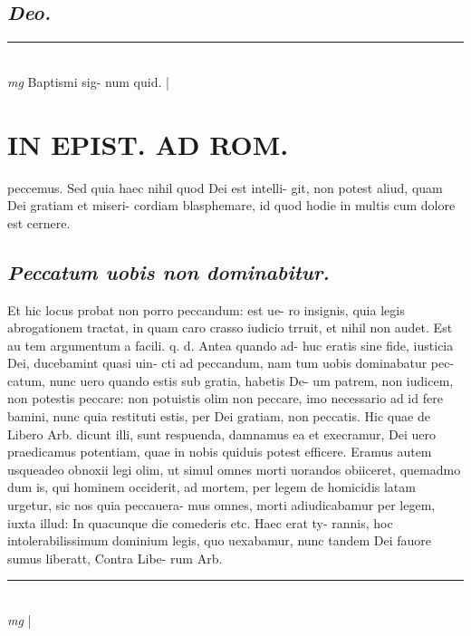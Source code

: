 \documentclass{article}
\begin{document}
\begin{pages}
\subsection*{\textit{Deo. }}
\vspace{0.5cm}\noindent
\vspace{0.2cm}\rule{1cm}{0.2pt}\\ 
\hspace{0.2cm}\textit{mg}
\footnotesize Baptismi sig- num quid.  
\normalsize| 
\section*{IN EPIST. AD ROM.  }
\marginpar{[ p.63 ]}\pstart peccemus. Sed quia haec nihil quod Dei est intelli- git, non potest aliud, quam Dei gratiam et miseri- cordiam blasphemare, id quod hodie in multis cum dolore est cernere.   \pend
{}
{}
\subsection*{\textit{Peccatum uobis non dominabitur. }}\pstart Et hic locus probat non porro peccandum: est ue- ro insignis, quia legis abrogationem tractat, in quam caro crasso iudicio trruit, et nihil non audet. Est au tem argumentum a facili. q. d. Antea quando ad- huc eratis sine fide, iusticia Dei, ducebamint quasi uin- cti ad peccandum, nam tum uobis dominabatur pec- catum, nunc uero quando estis sub gratia, habetis De- um patrem, non iudicem, non potestis peccare: non potuistis olim non peccare, imo necessario ad id fere bamini, nunc quia restituti estis, per Dei gratiam, non peccatis. Hic quae de Libero Arb. dicunt illi, sunt respuenda, damnamus ea et execramur, Dei uero praedicamus potentiam, quae in nobis quiduis potest efficere. Eramus autem usqueadeo obnoxii legi olim, ut simul omnes morti uorandos obiiceret, quemadmo dum is, qui hominem occiderit, ad mortem, per legem de homicidis latam urgetur, sic nos quia peccauera- mus omnes, morti adiudicabamur per legem, iuxta illud: In quacunque die comederis etc. Haec erat ty- rannis, hoc intolerabilissimum dominium legis, quo uexabamur, nunc tandem Dei fauore sumus liberatt, Contra Libe- rum Arb.   \pend
\vspace{0.5cm}\noindent
\vspace{0.2cm}\rule{1cm}{0.2pt}\\ 
\hspace{0.2cm}\textit{mg}
\footnotesize 
\normalsize| 

\end{pages}
\end{document}
